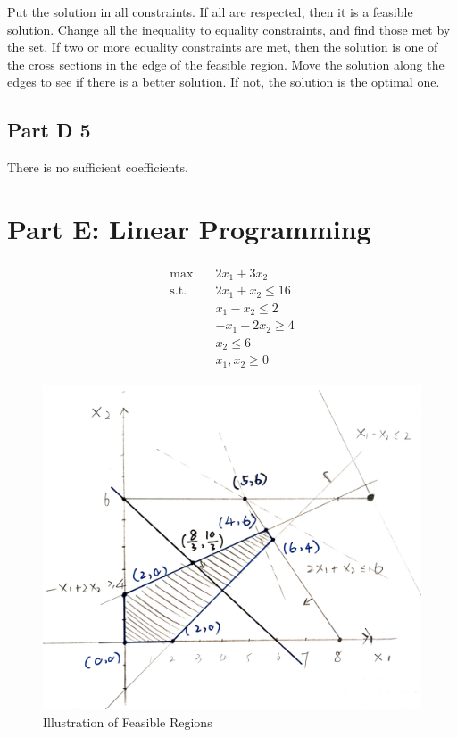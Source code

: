 \documentclass[fleqn,10pt]{wlscirep}
\begin{document}
Put the solution in all constraints. If all are respected, then it is a feasible solution. Change all the inequality to equality constraints, and find those met by the set. If two or more equality constraints are met, then the solution is one of the cross sections in the edge of the feasible region. Move the solution along the edges to see if there is a better solution. If not, the solution is the optimal one.

\subsection{Part D 5}

There is no sufficient coefficients.

\section{Part E: Linear Programming}

\begin{align} \begin{split}
    \max \quad & 2 x_{1}+3 x_{2} \\
    \text{s.t.} \quad 
    & 2 x_{1} + x_{2} \leq 16 \\ 
    & x_{1} - x_{2} \leq 2 \\
    & -x_{1} + 2 x_{2} \geq 4 \\
    & x_{2} \leq 6 \\ 
    & x_{1}, x_{2} \geq 0 
\end{split} \end{align} 

\begin{figure}[ht]
    \centering
    \includegraphics[width=0.6\linewidth]{./images/1.jpg}
    \caption{Illustration of Feasible Regions}
    \label{fig:1}
\end{figure}
\end{document}

